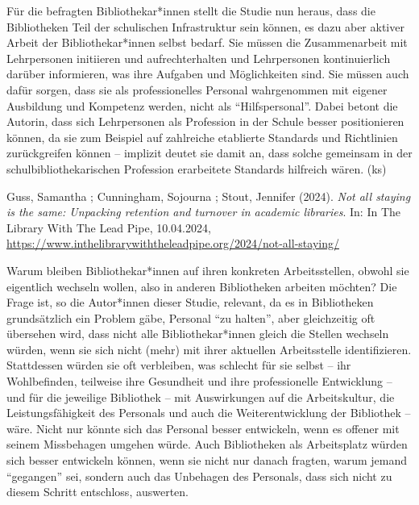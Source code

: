 \documentclass[a4paper,
fontsize=11pt,
oneside,
numbers=noperiodatend,
parskip=half-,
bibliography=totoc,
final
]{scrartcl}
\begin{document}
Für die befragten Bibliothekar*innen stellt die Studie nun heraus, dass
die Bibliotheken Teil der schulischen Infrastruktur sein können, es dazu
aber aktiver Arbeit der Bibliothekar*innen selbst bedarf. Sie müssen die
Zusammenarbeit mit Lehrpersonen initiieren und aufrechterhalten und
Lehrpersonen kontinuierlich darüber informieren, was ihre Aufgaben und
Möglichkeiten sind. Sie müssen auch dafür sorgen, dass sie als
professionelles Personal wahrgenommen mit eigener Ausbildung und
Kompetenz werden, nicht als \enquote{Hilfspersonal}. Dabei betont die
Autorin, dass sich Lehrpersonen als Profession in der Schule besser
positionieren können, da sie zum Beispiel auf zahlreiche etablierte
Standards und Richtlinien zurückgreifen können -- implizit deutet sie
damit an, dass solche gemeinsam in der schulbibliothekarischen
Profession erarbeitete Standards hilfreich wären. (ks)

Guss, Samantha ; Cunningham, Sojourna ; Stout, Jennifer (2024).
\emph{Not all staying is the same: Unpacking retention and turnover in
academic libraries}. In: In The Library With The Lead Pipe, 10.04.2024,
\url{https://www.inthelibrarywiththeleadpipe.org/2024/not-all-staying/}

Warum bleiben Bibliothekar*innen auf ihren konkreten Arbeitsstellen,
obwohl sie eigentlich wechseln wollen, also in anderen Bibliotheken
arbeiten möchten? Die Frage ist, so die Autor*innen dieser Studie,
relevant, da es in Bibliotheken grundsätzlich ein Problem gäbe, Personal
\enquote{zu halten}, aber gleichzeitig oft übersehen wird, dass nicht
alle Bibliothekar*innen gleich die Stellen wechseln würden, wenn sie
sich nicht (mehr) mit ihrer aktuellen Arbeitsstelle identifizieren.
Stattdessen würden sie oft verbleiben, was schlecht für sie selbst --
ihr Wohlbefinden, teilweise ihre Gesundheit und ihre professionelle
Entwicklung -- und für die jeweilige Bibliothek -- mit Auswirkungen auf
die Arbeitskultur, die Leistungsfähigkeit des Personals und auch die
Weiterentwicklung der Bibliothek -- wäre. Nicht nur könnte sich das
Personal besser entwickeln, wenn es offener mit seinem Missbehagen
umgehen würde. Auch Bibliotheken als Arbeitsplatz würden sich besser
entwickeln können, wenn sie nicht nur danach fragten, warum jemand
\enquote{gegangen} sei, sondern auch das Unbehagen des Personals, dass
sich nicht zu diesem Schritt entschloss, auswerten.
\end{document}
